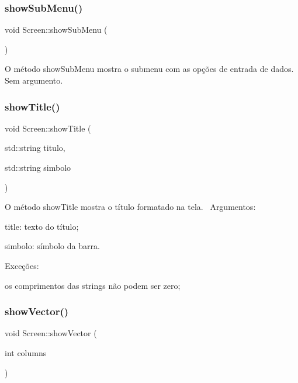 \subsubsection{\texorpdfstring{show\+Sub\+Menu()}{showSubMenu()}}
{\footnotesize\ttfamily void Screen\+::show\+Sub\+Menu (\begin{DoxyParamCaption}{ }\end{DoxyParamCaption})}

O método show\+Sub\+Menu mostra o submenu com as opções de entrada de dados.~\newline
Sem argumento.\mbox{\label{classScreen_aefbd91aee5978143823031767159caf7}} 
\subsubsection{\texorpdfstring{show\+Title()}{showTitle()}}
{\footnotesize\ttfamily void Screen\+::show\+Title (\begin{DoxyParamCaption}\item[{std\+::string}]{titulo,  }\item[{std\+::string}]{simbolo }\end{DoxyParamCaption})}

O método show\+Title mostra o título formatado na tela.~\newline
Argumentos\+:
\begin{DoxyItemize}
\item title\+: texto do título;
\item simbolo\+: símbolo da barra.
\end{DoxyItemize}

Exceções\+:
\begin{DoxyItemize}
\item os comprimentos das strings não podem ser zero;
\end{DoxyItemize}\mbox{\label{classScreen_aca2a46f65496651c74b66e807f7ed421}} 
\subsubsection{\texorpdfstring{show\+Vector()}{showVector()}}
{\footnotesize\ttfamily void Screen\+::show\+Vector (\begin{DoxyParamCaption}\item[{int}]{columns }\end{DoxyParamCaption})}

